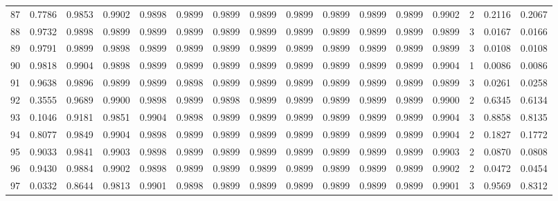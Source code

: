 \begin{tabular}{lrrrrrrrrrrrrrrr}
87  &      0.7786 &  0.9853 &  0.9902 &  0.9898 &  0.9899 &  0.9899 &  0.9899 &  0.9899 &  0.9899 &  0.9899 &   0.9899 &     0.9902 &      2 &                    0.2116 &                     0.2067 \\
88  &      0.9732 &  0.9898 &  0.9899 &  0.9899 &  0.9899 &  0.9899 &  0.9899 &  0.9899 &  0.9899 &  0.9899 &   0.9899 &     0.9899 &      3 &                    0.0167 &                     0.0166 \\
89  &      0.9791 &  0.9899 &  0.9898 &  0.9899 &  0.9899 &  0.9899 &  0.9899 &  0.9899 &  0.9899 &  0.9899 &   0.9899 &     0.9899 &      3 &                    0.0108 &                     0.0108 \\
90  &      0.9818 &  0.9904 &  0.9898 &  0.9899 &  0.9899 &  0.9899 &  0.9899 &  0.9899 &  0.9899 &  0.9899 &   0.9899 &     0.9904 &      1 &                    0.0086 &                     0.0086 \\
91  &      0.9638 &  0.9896 &  0.9899 &  0.9899 &  0.9898 &  0.9899 &  0.9899 &  0.9899 &  0.9899 &  0.9899 &   0.9899 &     0.9899 &      3 &                    0.0261 &                     0.0258 \\
92  &      0.3555 &  0.9689 &  0.9900 &  0.9898 &  0.9899 &  0.9898 &  0.9899 &  0.9899 &  0.9899 &  0.9899 &   0.9899 &     0.9900 &      2 &                    0.6345 &                     0.6134 \\
93  &      0.1046 &  0.9181 &  0.9851 &  0.9904 &  0.9898 &  0.9899 &  0.9899 &  0.9899 &  0.9899 &  0.9899 &   0.9899 &     0.9904 &      3 &                    0.8858 &                     0.8135 \\
94  &      0.8077 &  0.9849 &  0.9904 &  0.9898 &  0.9899 &  0.9899 &  0.9899 &  0.9899 &  0.9899 &  0.9899 &   0.9899 &     0.9904 &      2 &                    0.1827 &                     0.1772 \\
95  &      0.9033 &  0.9841 &  0.9903 &  0.9898 &  0.9899 &  0.9899 &  0.9899 &  0.9899 &  0.9899 &  0.9899 &   0.9899 &     0.9903 &      2 &                    0.0870 &                     0.0808 \\
96  &      0.9430 &  0.9884 &  0.9902 &  0.9898 &  0.9899 &  0.9899 &  0.9899 &  0.9899 &  0.9899 &  0.9899 &   0.9899 &     0.9902 &      2 &                    0.0472 &                     0.0454 \\
97  &      0.0332 &  0.8644 &  0.9813 &  0.9901 &  0.9898 &  0.9899 &  0.9899 &  0.9899 &  0.9899 &  0.9899 &   0.9899 &     0.9901 &      3 &                    0.9569 &                     0.8312 \\

\end{tabular}

